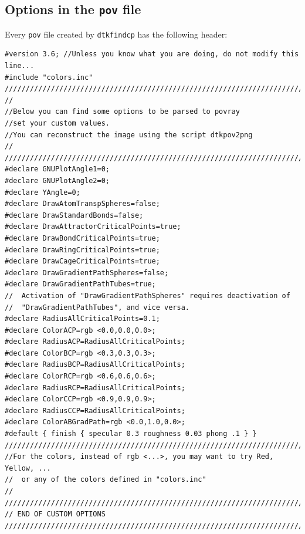 \subsection{\label{sec:povcustopts}Options in the \texttt{pov} file}

Every \texttt{pov} file created by \texttt{dtkfindcp} has the following header:
\begin{footnotesize}
\begin{verbatim}
#version 3.6; //Unless you know what you are doing, do not modify this line...
#include "colors.inc"
////////////////////////////////////////////////////////////////////////////////
//
//Below you can find some options to be parsed to povray
//set your custom values.
//You can reconstruct the image using the script dtkpov2png
//
////////////////////////////////////////////////////////////////////////////////
#declare GNUPlotAngle1=0;
#declare GNUPlotAngle2=0;
#declare YAngle=0;
#declare DrawAtomTranspSpheres=false;
#declare DrawStandardBonds=false;
#declare DrawAttractorCriticalPoints=true;
#declare DrawBondCriticalPoints=true;
#declare DrawRingCriticalPoints=true;
#declare DrawCageCriticalPoints=true;
#declare DrawGradientPathSpheres=false;
#declare DrawGradientPathTubes=true;
//  Activation of "DrawGradientPathSpheres" requires deactivation of 
//  "DrawGradientPathTubes", and vice versa.
#declare RadiusAllCriticalPoints=0.1;
#declare ColorACP=rgb <0.0,0.0,0.0>;
#declare RadiusACP=RadiusAllCriticalPoints;
#declare ColorBCP=rgb <0.3,0.3,0.3>;
#declare RadiusBCP=RadiusAllCriticalPoints;
#declare ColorRCP=rgb <0.6,0.6,0.6>;
#declare RadiusRCP=RadiusAllCriticalPoints;
#declare ColorCCP=rgb <0.9,0.9,0.9>;
#declare RadiusCCP=RadiusAllCriticalPoints;
#declare ColorABGradPath=rgb <0.0,1.0,0.0>;
#default { finish { specular 0.3 roughness 0.03 phong .1 } }
////////////////////////////////////////////////////////////////////////////////
//For the colors, instead of rgb <...>, you may want to try Red, Yellow, ...
//  or any of the colors defined in "colors.inc"
//
////////////////////////////////////////////////////////////////////////////////
// END OF CUSTOM OPTIONS
////////////////////////////////////////////////////////////////////////////////
\end{verbatim}
\end{footnotesize}

